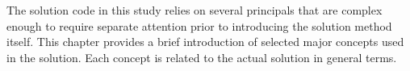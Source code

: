 The solution code in this study relies on several principals that are complex enough to require separate attention prior to introducing the solution method itself. This chapter provides a brief introduction of selected major concepts used in the solution. Each concept is related to the actual solution in general terms.  
